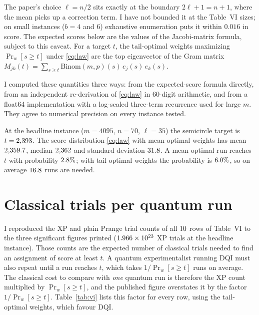 \documentclass[11pt]{article}
\newcommand{\Binom}{\mathrm{Binom}}
\begin{document}
The paper's choice $\ell=n/2$ sits exactly at the boundary $2\ell+1=n+1$, where the mean picks up a correction term.
I have not bounded it at the Table~VI sizes; on small instances ($b=4$ and $6$) exhaustive enumeration puts it within $0.016$ in score.
The expected scores below are the values of the Jacobi-matrix formula, subject to this caveat.
For a target $t$, the tail-optimal weights maximizing $\Pr_w[s\ge t]$ under \eqref{eq:law} are the top eigenvector of the Gram matrix $M_{jk}(t)=\sum_{s\ge t}\Binom(m,p)(s)\,e_j(s)\,e_k(s)$.

I computed these quantities three ways: from the expected-score formula directly, from an independent re-derivation of \eqref{eq:law} in 60-digit arithmetic, and from a float64 implementation with a log-scaled three-term recurrence used for large $m$.
They agree to numerical precision on every instance tested.

At the headline instance ($m=4095$, $n=70$, $\ell=35$) the semicircle target is $t=2{,}393$.
The score distribution \eqref{eq:law} with mean-optimal weights has mean $2{,}359.7$, median $2{,}362$ and standard deviation $31.8$.
A mean-optimal run reaches $t$ with probability $2.8\%$; with tail-optimal weights the probability is $6.0\%$, so on average $16.8$ runs are needed.

\section{Classical trials per quantum run}\label{sec:fair}

I reproduced the XP and plain Prange trial counts of all $10$ rows of Table~VI to the three significant figures printed ($1.966\times 10^{23}$ XP trials at the headline instance).
Those counts are the expected number of classical trials needed to find an assignment of score at least $t$.
A quantum experimentalist running DQI must also repeat until a run reaches $t$, which takes $1/\Pr_w[s\ge t]$ runs on average.
The classical cost to compare with \emph{one} quantum run is therefore the XP count multiplied by $\Pr_w[s\ge t]$, and the published figure overstates it by the factor $1/\Pr_w[s\ge t]$.
Table~\ref{tab:vi} lists this factor for every row, using the tail-optimal weights, which favour DQI.

\begin{table}[ht]
\centering

\caption{Instances of Table~VI of~\cite{khattar2025verifiable} ($b=10$ for $m=1023$, $b=12$ for $m=4095$, $\ell=n/2$). ``Overstatement'' is the number of tail-optimal DQI runs needed, on average, to reach the paper's target score $t$; dividing the paper's classical trial count by it gives the classical cost per quantum run. The headline instance is in bold.}
\label{tab:vi}
\end{table}
\end{document}

